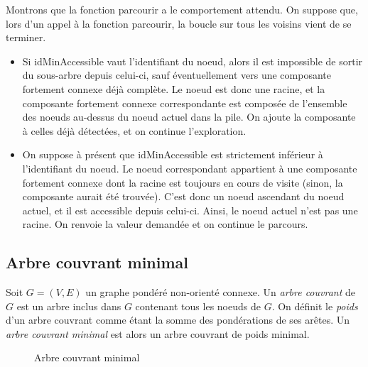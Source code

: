 \documentclass[11pt,a4paper]{article}
\begin{document}
Montrons que la fonction parcourir a le comportement attendu. On suppose que, lors d'un appel à la fonction parcourir, la boucle sur tous les voisins vient de se terminer.
\begin{itemize}
  \item Si idMinAccessible vaut l'identifiant du noeud, alors il est impossible de sortir du sous-arbre depuis celui-ci, sauf éventuellement vers une composante fortement connexe déjà complète. Le noeud est donc une racine, et la composante fortement connexe correspondante est composée de l'ensemble des noeuds au-dessus du noeud actuel dans la pile. On ajoute la composante à celles déjà détectées, et on continue l'exploration.
  \item On suppose à présent que idMinAccessible est strictement inférieur à l'identifiant du noeud. Le noeud correspondant appartient à une composante fortement connexe dont la racine est toujours en cours de visite (sinon, la composante aurait été trouvée). C'est donc un noeud ascendant du noeud actuel, et il est accessible depuis celui-ci. Ainsi, le noeud actuel n'est pas une racine. On renvoie la valeur demandée et on continue le parcours.
\end{itemize}


  \subsection{Arbre couvrant minimal}
Soit \(G=(V,E)\) un graphe pondéré non-orienté connexe. Un \textit{arbre couvrant} de \(G\) est un arbre inclus dans \(G\) contenant tous les noeuds de \(G\). On définit le \textit{poids} d'un arbre couvrant comme étant la somme des pondérations de ses arêtes. Un \textit{arbre couvrant minimal} est alors un arbre couvrant de poids minimal.

\begin{figure}[h]
  \label{arbre-couvrant-minimal}
  \centering
  \caption{Arbre couvrant minimal}
  \vspace{2mm}

\end{figure}
\end{document}
